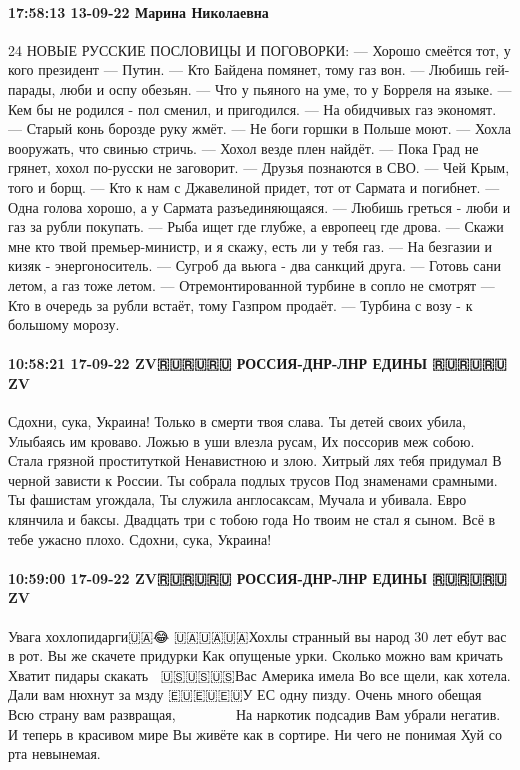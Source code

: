 \paragraph{17:58:13 13-09-22 Марина Николаевна}

24 НОВЫЕ РУССКИЕ ПОСЛОВИЦЫ И ПОГОВОРКИ:
— Хорошо смеётся тот, у кого президент — Путин.
— Кто Байдена помянет, тому газ вон.
— Любишь гей-парады, люби и оспу обезьян.
— Что у пьяного на уме, то у Борреля на языке.
— Кем бы не родился - пол сменил, и пригодился.
— На обидчивых газ экономят.
— Старый конь борозде руку жмёт.
— Не боги горшки в Польше моют.
— Хохла вооружать, что свинью стричь.
— Хохол везде плен найдёт.
— Пока Град не грянет, хохол по-русски не заговорит.
— Друзья познаются в СВО.
— Чей Крым, того и борщ.
— Кто к нам с Джавелиной придет, тот от Сармата и погибнет.
— Одна голова хорошо, а у Сармата разъединяющаяся.
— Любишь греться - люби и газ за рубли покупать.
— Рыба ищет где глубже, а европеец где дрова.
— Скажи мне кто твой премьер-министр, и я скажу, есть ли у тебя газ.
— На безгазии и кизяк - энергоноситель.
— Сугроб да вьюга - два санкций друга.
— Готовь сани летом, а газ тоже летом.
— Отремонтированной турбине в сопло не смотрят
— Кто в очередь за рубли встаёт, тому Газпром продаёт.
— Турбина с возу - к большому морозу.


\paragraph{10:58:21 17-09-22 ZV🇷🇺🇷🇺🇷🇺 РОССИЯ-ДНР-ЛНР ЕДИНЫ 🇷🇺🇷🇺🇷🇺ZV}

Сдохни, сука, Украина!
Только в смерти твоя слава.
Ты детей своих убила,
Улыбаясь им кроваво.
Ложью в уши влезла русам,
Их поссорив меж собою.
Стала грязной проституткой
Ненавистною и злою.
Хитрый лях тебя придумал
В черной зависти к России.
Ты собрала подлых трусов
Под знаменами срамными.
Ты фашистам угождала,
Ты служила англосаксам,
Мучала и убивала.
Евро клянчила и баксы.
Двадцать три с тобою года
Но твоим не стал я сыном.
Всё в тебе ужасно плохо.
Сдохни, сука, Украина!

\paragraph{10:59:00 17-09-22 ZV🇷🇺🇷🇺🇷🇺 РОССИЯ-ДНР-ЛНР ЕДИНЫ 🇷🇺🇷🇺🇷🇺ZV}

Увага хохлопидарги🇺🇦😂
🇺🇦🇺🇦🇺🇦Хохлы странный вы народ
30 лет ебут вас в рот.
Вы же скачете придурки
Как опущеные урки.
Сколько можно вам кричать
Хватит пидары скакать🏳‍🌈
🇺🇸🇺🇸🇺🇸Вас Америка имела
Во все щели, как хотела.
Дали вам нюхнут за мзду
🇪🇺🇪🇺🇪🇺У ЕС одну пизду.
Очень много обещая
Всю страну вам развращая, 🏳‍🌈🇺🇦🏳‍🌈🇺🇦🇺🇸🏳‍🌈😂
На наркотик подсадив
Вам убрали негатив.
И теперь в красивом мире
Вы живёте как в сортире.
Ни чего не понимая
Хуй со рта невынемая.
🏳‍🌈🇺🇦🇺🇸🏳‍🌈🇺🇦🏳‍🌈🇺🇸😂😂😂


